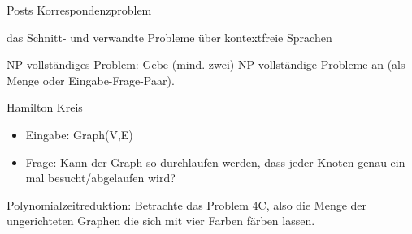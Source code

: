 \documentclass[10pt, a4paper]{exam}
\begin{document}
\begin{questions}
\begin{solution}
    Posts Korrespondenzproblem

    das Schnitt- und verwandte Probleme über kontextfreie Sprachen
  \end{solution}

  \question NP-vollständiges Problem: Gebe (mind. zwei) NP-vollständige Probleme an (als Menge oder Eingabe-Frage-Paar).
  \begin{solution}

    Hamilton Kreis
    \begin{itemize}
      \item Eingabe: Graph(V,E)
      \item Frage: Kann der Graph so durchlaufen werden, dass jeder Knoten genau ein mal besucht/abgelaufen wird?
    \end{itemize}

  \end{solution}

  \question Polynomialzeitreduktion: Betrachte das Problem 4C, also die Menge der ungerichteten Graphen die sich mit vier Farben färben lassen.
\end{questions}
\end{document}
